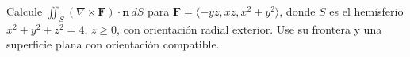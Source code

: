 ﻿Calcule $\iint_S(\nabla\times\mathbf F)\cdot\mathbf n\,dS$ para $\mathbf F=\langle-yz,xz,x^2+y^2\rangle$, donde $S$ es el hemisferio $x^2+y^2+z^2=4$, $z\geq0$, con orientación radial exterior. Use su frontera y una superficie plana con orientación compatible.
